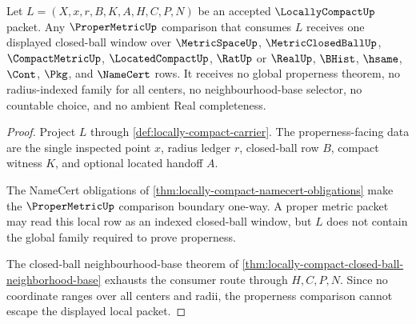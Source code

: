 \begin{theorem}
\label{thm:locally-compact-properness-comparison-nonescape}
Let $L=(X,x,r,B,K,A,H,C,P,N)$ be an accepted $\LocallyCompactUp$ packet. Any $\ProperMetricUp$ comparison that consumes $L$ receives one displayed closed-ball window over $\MetricSpaceUp$, $\MetricClosedBallUp$, $\CompactMetricUp$, $\LocatedCompactUp$, $\RatUp$ or $\RealUp$, $\BHist$, $\hsame$, $\Cont$, $\Pkg$, and $\NameCert$ rows. It receives no global properness theorem, no radius-indexed family for all centers, no neighbourhood-base selector, no countable choice, and no ambient Real completeness.
\end{theorem}
\begin{proof}
Project $L$ through \autoref{def:locally-compact-carrier}. The properness-facing data are the single inspected point $x$, radius ledger $r$, closed-ball row $B$, compact witness $K$, and optional located handoff $A$.

The NameCert obligations of \autoref{thm:locally-compact-namecert-obligations} make the $\ProperMetricUp$ comparison boundary one-way. A proper metric packet may read this local row as an indexed closed-ball window, but $L$ does not contain the global family required to prove properness.

The closed-ball neighbourhood-base theorem of \autoref{thm:locally-compact-closed-ball-neighborhood-base} exhausts the consumer route through $H,C,P,N$. Since no coordinate ranges over all centers and radii, the properness comparison cannot escape the displayed local packet.
\end{proof}

